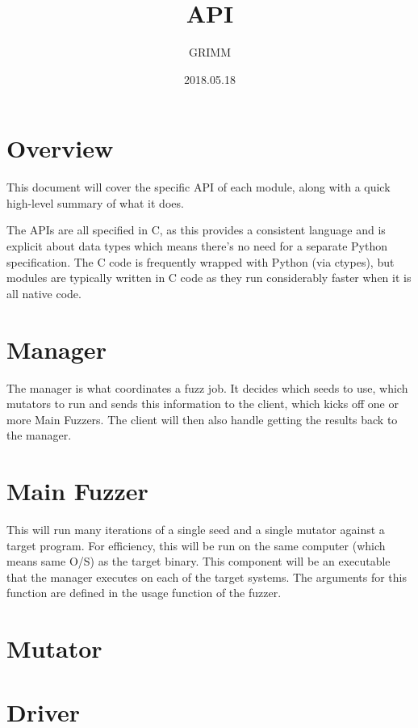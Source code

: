 \documentclass{article}
\title{\killerbeez{} API}
\author{GRIMM}
\date{2018.05.18}
\begin{document}
\thispagestyle{empty}
\maketitle
\newpage

\tableofcontents
\newpage

\section{Overview}
This document will cover the specific API of each module, along with a quick
high-level summary of what it does.

\par
The APIs are all specified in C, as this provides a consistent language and is
explicit about data types which means there's no need for a separate Python
specification.  The C code is frequently wrapped with Python (via ctypes), but
modules are typically written in C code as they run considerably faster when
it is all native code.

\section{Manager}
The manager is what coordinates a fuzz job.  It decides which seeds to use,
which mutators to run and sends this information to the client, which kicks
off one or more Main Fuzzers.  The client will then also handle getting the
results back to the manager.

\section{Main Fuzzer}
This will run many iterations of a single seed and a single mutator against a
target program.  For efficiency, this will be run on the same computer (which
means same O/S) as the target binary.  This component will be an executable that
the manager executes on each of the target systems.  The arguments for this
function are defined in the usage function of the fuzzer.

\section{Mutator}
\label{mutator}


\section{Driver}
\label{driver}

\end{document}
